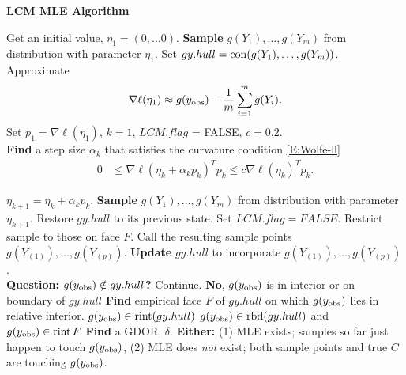 {\singlespacing 
{\small
\noindent \textbf{LCM MLE Algorithm}

\noindent \begin{algorithmic}
\State Get an initial value, $\eta_1 = (0, \ldots 0)$.
\State \textbf{Sample} $g(Y_1), \ldots, g(Y_m)$ from distribution with parameter $\eta_{1}$.  
\State Set $gy.hull = \operatorname{con}(g(Y_1), \ldots, g(Y_m) )$.
\State Approximate 
\begin{align*}
\nabla \ell( \eta_1) \approx g(y_{\text{obs}}) - \frac{1}{m}\sum_{i=1}^m g(Y_i).
\end{align*}
\State Set $p_1 = \nabla \ell( \eta_1)$, $k=1$, $LCM.flag$ = FALSE, $c=0.2$.\\

\State \textbf{Find} a step size $\alpha_k$ that satisfies the curvature condition \eqref{E:Wolfe-ll}
\begin{align*}%
	 0 & \leq \nabla \ell( \eta_k + \alpha_k p_k)^T p_k \leq c \nabla \ell(\eta_k)^T p_k.
\end{align*}

\State $\eta_{k+1} = \eta_k + \alpha_k p_k$.
\State \textbf{Sample} $g(Y_1), \ldots, g(Y_m)$ from distribution with parameter $\eta_{k+1}$.
		\State Restore $gy.hull$ to its previous state.
		\State Set $LCM.flag = FALSE$.
	\Else
		\State Restrict sample to those on face $F$.
	\EndIf
\EndIf
\State Call the resulting sample points $g(Y_{(1)}), \ldots, g(Y_{(p)})$.
\State \textbf{Update} $gy.hull$ to incorporate $g(Y_{(1)}), \ldots, g(Y_{(p)}) $.\\
\State \textbf{Question: $g(y_{\text{obs}}) \notin gy.hull$?}
	\State  Continue.
\Else
\State \textbf{No}, $g(y_{\text{obs}})$ is in interior or on boundary of $gy.hull$
	\State \textbf{Find} empirical face $F$ of $gy.hull$ on which $g(y_{\text{obs}})$ 
	lies in relative interior.
		\State $g(y_{\text{obs}}) \in \operatorname{rint}( gy.hull )$ 
	\Else
	\State $g(y_{\text{obs}}) \in \operatorname{rbd}( gy.hull )$ and $g(y_{\text{obs}}) \in \operatorname{rint} F$
		\State \textbf{Find} a GDOR, $\delta$.
		\State \textbf{Either:}
		\State (1) MLE exists; samples so far just happen to touch $g(y_{\text{obs}})$, 
		\State (2) MLE does \emph{not} exist; both sample points and true $C$ are
		touching $g(y_{\text{obs}})$.


\end{algorithmic}}}
